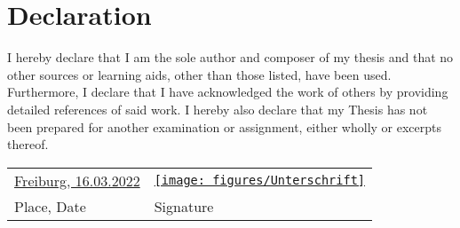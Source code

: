 
\chapter*{Declaration}

I hereby declare that I am the sole author and composer of my thesis and that no other sources or learning aids, other than those listed, have been used. Furthermore, I declare that I have acknowledged the work of others by providing detailed references of said work.  \newline
I hereby also declare that my Thesis has not been prepared for another examination
or assignment, either wholly or excerpts thereof.
\\[3\normalbaselineskip]
\begin{tabular}{p{} l}
  \underline{Freiburg, 16.03.2022}   &  \underline{\texttt{[image: figures/Unterschrift]}} \\
  Place, Date                  &   Signature
\end{tabular}
